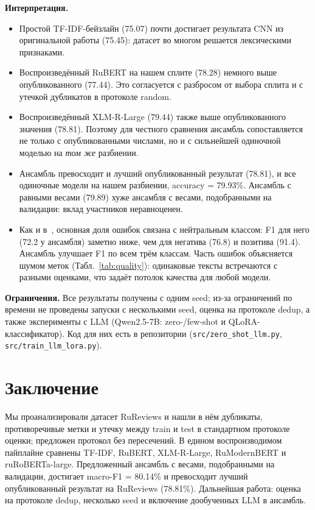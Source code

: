 \documentclass{article}
\newcommand{\fTfidf}{75.07}
\newcommand{\fRubert}{78.28}
\newcommand{\fXlmr}{79.44}
\newcommand{\fEns}{80.14}
\newcommand{\aEns}{79.93}
\newcommand{\fEnsUni}{79.89}
\begin{document}
\textbf{Интерпретация.}
\begin{itemize}
    \item Простой TF-IDF-бейзлайн (\fTfidf) почти достигает результата CNN из оригинальной работы (75.45): датасет во многом решается лексическими признаками.
    \item Воспроизведённый RuBERT на нашем сплите (\fRubert) немного выше опубликованного (77.44). Это согласуется с разбросом от выбора сплита и с утечкой дубликатов в протоколе random.
    \item Воспроизведённый XLM-R-Large (\fXlmr) также выше опубликованного значения (78.81). Поэтому для честного сравнения ансамбль сопоставляется не только с опубликованными числами, но и с сильнейшей одиночной моделью на \emph{том же} разбиении.
    \item Ансамбль превосходит и лучший опубликованный результат (78.81), и все одиночные модели на нашем разбиении, accuracy = \aEns\%. Ансамбль с равными весами (\fEnsUni) хуже ансамбля с весами, подобранными на валидации: вклад участников неравноценен.
    \item Как и в~\cite{smetanin2021deep}, основная доля ошибок связана с нейтральным классом: F1 для него (72.2 у ансамбля) заметно ниже, чем для негатива (76.8) и позитива (91.4). Ансамбль улучшает F1 по всем трём классам. Часть ошибок объясняется шумом меток (Табл.~\ref{tab:quality}): одинаковые тексты встречаются с разными оценками, что задаёт потолок качества для любой модели.
\end{itemize}

\textbf{Ограничения.} Все результаты получены с одним seed; из-за ограничений по времени не проведены запуски с несколькими seed, оценка на протоколе dedup, а также эксперименты с LLM (Qwen2.5-7B: zero-/few-shot и QLoRA-классификатор). Код для них есть в репозитории (\texttt{src/zero\_shot\_llm.py}, \texttt{src/train\_llm\_lora.py}).

\section{Заключение}
Мы проанализировали датасет RuReviews и нашли в нём дубликаты, противоречивые метки и утечку между train и test в стандартном протоколе оценки; предложен протокол без пересечений. В едином воспроизводимом пайплайне сравнены TF-IDF, RuBERT, XLM-R-Large, RuModernBERT и ruRoBERTa-large. Предложенный ансамбль с весами, подобранными на валидации, достигает macro-F1 = \fEns\% и превосходит лучший опубликованный результат на RuReviews (78.81\%). Дальнейшая работа: оценка на протоколе dedup, несколько seed и включение дообученных LLM в ансамбль.



\end{document}
